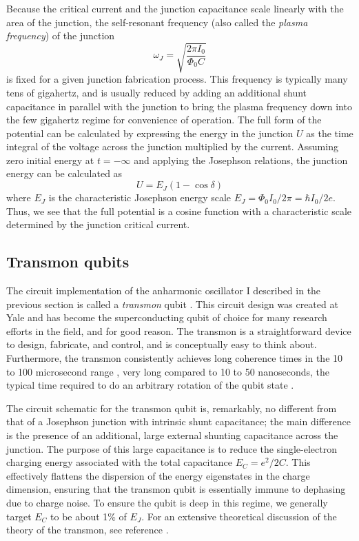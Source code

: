 Because the critical current and the junction capacitance scale linearly with the area of the junction, the self-resonant frequency (also called the \textit{plasma frequency}) of the junction
\begin{equation}
\omega_J = \sqrt{\frac{2 \pi I_0}{\Phi_0 C}}
\label{eq:plas_freq}
\end{equation}
is fixed for a given junction fabrication process.  This frequency is typically many tens of gigahertz, and is usually reduced by adding an additional shunt capacitance in parallel with the junction to bring the plasma frequency down into the few gigahertz regime for convenience of operation.  The full form of the potential can be calculated by expressing the energy in the junction $U$ as the time integral of the voltage across the junction multiplied by the current.  Assuming zero initial energy at $t = - \infty$ and applying the Josephson relations, the junction energy can be calculated as \cite{slichterthesis}
\begin{equation}
U = E_J (1 - \cos{\delta})
\label{eq:E_J}
\end{equation}
where $E_J$ is the characteristic Josephson energy scale $E_J = \Phi_0 I_0/2\pi = \hbar I_0/2e$.  Thus, we see that the full potential is a cosine function with a characteristic scale determined by the junction critical current.

\subsection{Transmon qubits}

The circuit implementation of the anharmonic oscillator I described in the previous section is called a \textit{transmon} qubit \cite{Houck2009,transmontheory}.  This circuit design was created at Yale and has become the superconducting qubit of choice for many research efforts in the field, and for good reason.  The transmon is a straightforward device to design, fabricate, and control, and is conceptually easy to think about.  Furthermore, the transmon consistently achieves long coherence times in the 10 to 100 microsecond range \cite{PhysRevB.77.180502,Paik_3DT}, very long compared to 10 to 50 nanoseconds, the typical time required to do an arbitrary rotation of the qubit state \cite{PhysRevLett.102.090502}.

The circuit schematic for the transmon qubit is, remarkably, no different from that of a Josephson junction with intrinsic shunt capacitance; the main difference is the presence of an additional, large external shunting capacitance across the junction.  The purpose of this large capacitance is to reduce the single-electron charging energy associated with the total capacitance $E_C = e^2 / 2 C$.  This effectively flattens the dispersion of the energy eigenstates in the charge dimension, ensuring that the transmon qubit is essentially immune to dephasing due to charge noise.  To ensure the qubit is deep in this regime, we generally target $E_C$ to be about 1\% of $E_J$.  For an extensive theoretical discussion of the theory of the transmon, see reference \cite{transmontheory}.

